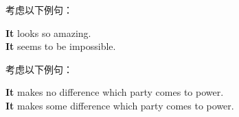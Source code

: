 \documentclass[UTF8]{ctexart}
\begin{document}
    考虑以下例句：\vspace{-5pt}
    \begin{center}
        \ttfamily\large
        \textbf{It} looks so amazing.\\[3mm]
        \textbf{It} seems to be impossible.\\[6mm]
    \end{center}
    考虑以下例句：\vspace{5pt}
    \begin{center}
        \ttfamily\large
        \textbf{It} makes no difference which party comes to power.\\[3mm]
        \textbf{It} makes some difference which party comes to power.
    \end{center}

\newpage
\end{document}
